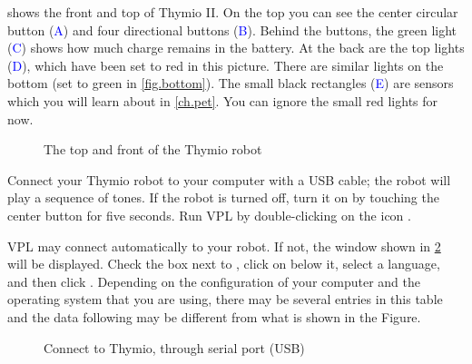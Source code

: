 


 shows the front and top of Thymio II. On the
top you can see the center circular button (\textcolor{blue}{A}) and four directional buttons (\textcolor{blue}{B}).
Behind the buttons, the green light (\textcolor{blue}{C}) shows how much charge remains in the
battery. At the back are the top lights (\textcolor{blue}{D}), which have been set to red in this picture.
There are similar lights on the bottom (set to green in \cref{fig.bottom}).
The small black rectangles (\textcolor{blue}{E}) are sensors which
you will learn about in \cref{ch.pet}. You can ignore the small
red lights for now.

\begin{figure}[h]
\begin{center}
\caption{The top and front of the Thymio robot}\label{fig.front}
\end{center}
\end{figure}

\pagebreak


Connect your Thymio robot to your computer with a USB cable; the robot will play a sequence of tones.
If the robot is turned off, turn it on by touching the center
button for five seconds. Run VPL by double-clicking on the icon
.


VPL may connect automatically to your robot.
If not, the window shown in \cref{fig.connect} will be
displayed. Check the box next to , click on  below it, select a language, and then click
.
Depending on the configuration of your computer
and the operating system that you are using, there may be several
entries in this table and the data following  may be
different from what is shown in the Figure.


\begin{figure}
\begin{center}
\caption{Connect to Thymio, through serial port (USB)}\label{fig.connect}
\end{center}
\end{figure}

